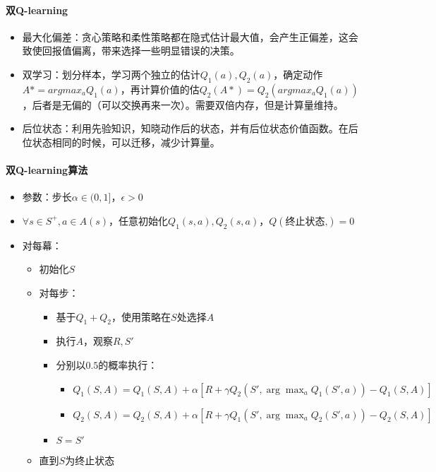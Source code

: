 \documentclass[
12pt, %
a4paper, 
oneside, %
headinclude,footinclude, %
]{scrartcl}
\begin{document}
\paragraph{双Q-learning}
\begin{itemize}
\item 最大化偏差：贪心策略和柔性策略都在隐式估计最大值，会产生正偏差，这会致使回报值偏离，带来选择一些明显错误的决策。
\item 双学习：划分样本，学习两个独立的估计$ Q_1(a),Q_2(a) $，确定动作$ A* = argmax_a Q_1(a) $，再计算价值的估$ Q_2(A*) = Q_2(argmax_a Q_1(a)) $，后者是无偏的（可以交换再来一次）。需要双倍内存，但是计算量维持。
\item 后位状态：利用先验知识，知晓动作后的状态，并有后位状态价值函数。在后位状态相同的时候，可以迁移，减少计算量。
\end{itemize}
\paragraph{双Q-learning算法}
\begin{itemize}
\item 参数：步长$ \alpha \in (0,1] $，$ \epsilon > 0 $
\item $ \forall s \in S^+, a \in A(s) $，任意初始化$ Q_1(s,a),Q_2(s,a) $，$ Q(\text{终止状态,}) = 0 $
\item 对每幕：
\begin{itemize}
\item 初始化$ S $
\item 对每步：
\begin{itemize}
\item 基于$ Q_1 + Q_2 $，使用策略在$ S $处选择$ A $
\item 执行$ A $，观察$ R,S' $
\item 分别以$ 0.5 $的概率执行：
\begin{itemize}
\item $ Q_1(S, A) = Q_1(S, A) + \alpha [R + \gamma Q_2(S', \arg \max_a Q_1(S',a)) - Q_1(S, A)] $
\item $ Q_2(S, A) = Q_2(S, A) + \alpha [R + \gamma Q_1(S', \arg \max_a Q_2(S',a)) - Q_2(S, A)] $
\end{itemize}
\item $ S = S' $
\end{itemize}
\item 直到$ S $为终止状态
\end{itemize}
\end{itemize}
\end{document}
